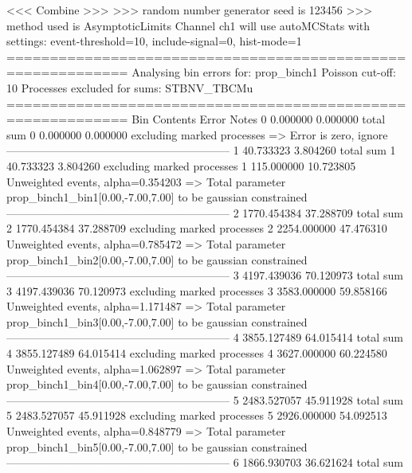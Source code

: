  <<< Combine >>> 
>>> random number generator seed is 123456
>>> method used is AsymptoticLimits
Channel ch1 will use autoMCStats with settings: event-threshold=10, include-signal=0, hist-mode=1
============================================================
Analysing bin errors for: prop_binch1
Poisson cut-off: 10
Processes excluded for sums: STBNV_TBCMu
============================================================
Bin        Contents        Error           Notes                         
0          0.000000        0.000000        total sum                     
0          0.000000        0.000000        excluding marked processes    
  => Error is zero, ignore      
------------------------------------------------------------
1          40.733323       3.804260        total sum                     
1          40.733323       3.804260        excluding marked processes    
1          115.000000      10.723805       Unweighted events, alpha=0.354203
  => Total parameter prop_binch1_bin1[0.00,-7.00,7.00] to be gaussian constrained
------------------------------------------------------------
2          1770.454384     37.288709       total sum                     
2          1770.454384     37.288709       excluding marked processes    
2          2254.000000     47.476310       Unweighted events, alpha=0.785472
  => Total parameter prop_binch1_bin2[0.00,-7.00,7.00] to be gaussian constrained
------------------------------------------------------------
3          4197.439036     70.120973       total sum                     
3          4197.439036     70.120973       excluding marked processes    
3          3583.000000     59.858166       Unweighted events, alpha=1.171487
  => Total parameter prop_binch1_bin3[0.00,-7.00,7.00] to be gaussian constrained
------------------------------------------------------------
4          3855.127489     64.015414       total sum                     
4          3855.127489     64.015414       excluding marked processes    
4          3627.000000     60.224580       Unweighted events, alpha=1.062897
  => Total parameter prop_binch1_bin4[0.00,-7.00,7.00] to be gaussian constrained
------------------------------------------------------------
5          2483.527057     45.911928       total sum                     
5          2483.527057     45.911928       excluding marked processes    
5          2926.000000     54.092513       Unweighted events, alpha=0.848779
  => Total parameter prop_binch1_bin5[0.00,-7.00,7.00] to be gaussian constrained
------------------------------------------------------------
6          1866.930703     36.621624       total sum                     
